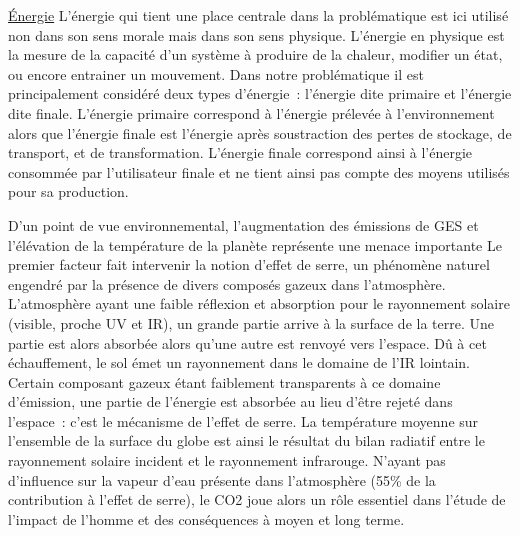 \href{https://fr.wikipedia.org/wiki/%C3%89nergie_(physique)}{Énergie}
L’énergie qui tient une place centrale dans la problématique est ici utilisé non dans
son sens morale mais dans son sens physique. L’énergie en physique est la mesure
de la capacité d’un système à produire de la chaleur, modifier un état, ou encore
entrainer un mouvement. Dans notre problématique il est principalement considéré
deux types d’énergie~: l’énergie dite primaire et l’énergie dite finale.
L’énergie primaire correspond à l’énergie prélevée à l’environnement alors que l’énergie
finale est l’énergie après soustraction des pertes de stockage, de transport, et de
transformation. L’énergie finale correspond ainsi à l’énergie consommée par l’utilisateur
finale et ne tient ainsi pas compte des moyens utilisés pour sa production.


D’un point de vue environnemental, l’augmentation des émissions de GES et l’élévation
de la température de la planète représente une menace importante
Le premier facteur fait intervenir la notion d’effet de serre, un phénomène naturel
engendré par la présence de divers composés gazeux dans l’atmosphère.
L’atmosphère ayant une faible réflexion et absorption pour le rayonnement solaire
(visible, proche UV et IR), un grande partie arrive à la surface de la terre. Une
partie est alors absorbée alors qu’une autre est renvoyé vers l’espace. Dû à cet
échauffement, le sol émet un rayonnement dans le domaine de l’IR lointain. Certain
composant gazeux étant faiblement transparents à ce domaine d’émission, une partie
de l’énergie est absorbée au lieu d’être rejeté dans l’espace~: c’est le mécanisme
de l’effet de serre.
La température moyenne sur l’ensemble de la surface du globe est ainsi le résultat
du bilan radiatif entre le rayonnement solaire incident et le rayonnement infrarouge.
N’ayant pas d’influence sur la vapeur d’eau présente dans l’atmosphère
(55\% de la contribution à l’effet de serre), le CO2 joue alors un rôle essentiel
dans l’étude de l’impact de l’homme et des conséquences à moyen et long terme.





